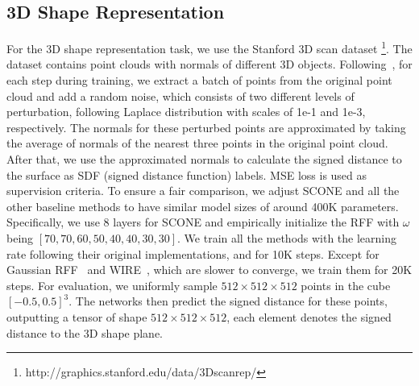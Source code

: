 \documentclass[letterpaper]{article} %
\begin{document}
\begin{table}[ht]
\begin{center}
\end{center}
\caption{Results on video representation task. The mean $\pm$ standard deviation across all frames is reported. SCONE achieves the best performance in terms of PSNR. It ties with SIREN in SSIM, but with smaller variance across frames.}
\label{tab:video_results}
\end{table}



\subsection{3D Shape Representation}
\label{subsec:3dshape}
For the 3D shape representation task, we use the Stanford 3D scan dataset \footnote[2]{http://graphics.stanford.edu/data/3Dscanrep/}. The dataset contains point clouds with normals of different 3D objects. Following~\cite{lindell2022bacon}, for each step during training, we extract a batch of points from the original point cloud and add a random noise, which consists of two different levels of perturbation, following Laplace distribution with scales of 1e-1 and 1e-3, respectively. The normals for these perturbed points are approximated by taking the average of normals of the nearest three points in the original point cloud. After that, we use the approximated normals to calculate the signed distance to the surface as SDF (signed distance function) labels. MSE loss is used as supervision criteria. To ensure a fair comparison, we adjust SCONE and all the other baseline methods to have similar model sizes of around 400K parameters. Specifically, we use 8 layers for SCONE and empirically initialize the RFF with $\omega$ being $[70, 70, 60, 50, 40, 40, 30, 30]$. We train all the methods with the learning rate following their original implementations, and for 10K steps. Except for Gaussian RFF~\cite{tancik2020fourier} and WIRE~\cite{saragadam2023wire}, which are slower to converge, we train them for 20K steps. For evaluation, we uniformly sample $512\times 512 \times 512$ points in the cube $[-0.5, 0.5]^3$. The networks then predict the signed distance for these points, outputting a tensor of shape $512\times 512 \times 512$, each element denotes the signed distance to the 3D shape plane. 
\end{document}
